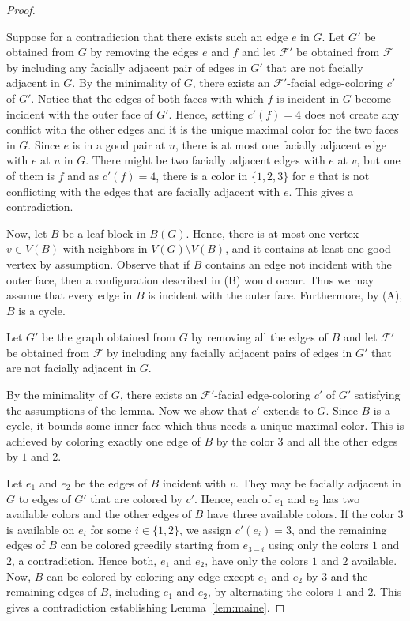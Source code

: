 \documentclass[a4paper,12pt]{article}
\begin{document}
\begin{proof}
\begin{itemize}
		\smallskip
		Suppose for a contradiction that there exists such an edge $e$ in $G$.
		Let $G'$ be obtained from $G$ by removing the edges $e$ and $f$  		
		and let $\mathcal{F}'$ be obtained from $\mathcal{F}$ by including any facially adjacent pair of edges
		in $G'$ that are not facially adjacent in $G$.
		By the minimality of $G$, there exists an $\mathcal{F}'$-facial edge-coloring $c'$ of $G'$.		
		Notice that the edges of both faces with which $f$ is incident in $G$ become incident with the outer face of $G'$.
		Hence, setting $c'(f) = 4$ does not create any conflict with the other edges and it is the unique maximal color for the two faces in $G$.
		Since $e$ is in a good pair at $u$, there is at most one facially adjacent edge with $e$ at $u$ in $G$.
		There might be two facially adjacent edges with $e$ at $v$, but one of them is $f$ and as $c'(f)=4$,
		there is a color in $\{1,2,3\}$ for $e$ that is not conflicting with the edges that are facially adjacent with $e$.
		This gives a contradiction.
	\end{itemize}

	Now, let $B$ be a leaf-block in $B(G)$.
	Hence, there is at most one vertex $v \in V(B)$ with neighbors in $V(G) \setminus V(B)$,
	and it contains at least one good vertex by assumption.
	Observe that if $B$ contains an edge not incident with the outer face, then a configuration described in (B) would occur.
	Thus we may assume that every edge in $B$ is incident with the outer face. Furthermore, by (A), $B$ is a cycle.

	Let $G'$ be the graph obtained from $G$ by removing all the edges of $B$
	and let $\mathcal{F}'$ be obtained from $\mathcal{F}$ by
	including any facially adjacent pairs of edges in $G'$ that are not facially adjacent in $G$.

	By the minimality of $G$, there exists an $\mathcal{F}'$-facial edge-coloring $c'$ of $G'$
	satisfying the assumptions of the lemma.
	Now we show that $c'$ extends to $G$.
	Since $B$ is a cycle, it bounds some inner face which thus needs a unique maximal color.
	This is achieved by coloring exactly one edge of $B$ by the color $3$ and all the other edges by $1$ and $2$.

	Let $e_1$ and $e_2$ be the edges of $B$ incident with $v$. They may be facially adjacent in $G$ to edges of $G'$ that are colored by $c'$.
	Hence, each of $e_1$ and $e_2$ has two available colors and the other edges of $B$ have three available colors.
	If the color $3$ is available on $e_i$ for some $i \in \{1,2\}$, we assign $c'(e_i)=3$,
	and the remaining edges of $B$ can be colored greedily starting from $e_{3-i}$ using only the colors $1$ and $2$, a contradiction.
	Hence both, $e_1$ and $e_2$, have only the colors $1$ and $2$ available.
	Now, $B$ can be colored by coloring any edge except $e_1$ and $e_2$ by $3$ and the remaining edges of $B$, including $e_1$ and $e_2$,
	by alternating the colors $1$ and $2$. This gives a contradiction establishing Lemma~\ref{lem:maine}.
\end{proof}
\end{document}
